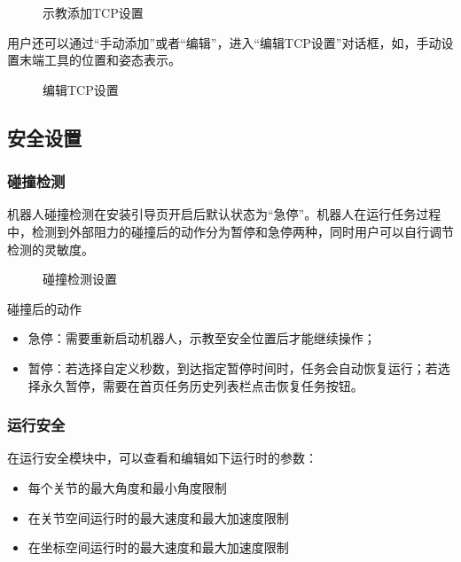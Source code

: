 \begin{figure}[ht]
	\centering
	\color{red}{缺图}
	\caption{示教添加TCP设置}
	\label{fig:示教添加TCP设置}
\end{figure}

用户还可以通过“手动添加”或者“编辑”，进入“编辑TCP设置”对话框，如，手动设置末端工具的位置和姿态表示。

\begin{figure}[ht]
	\centering
	\color{red}{缺图}
	\caption{编辑TCP设置}
	\label{fig:编辑TCP设置}
\end{figure}

\subsection{安全设置}
\subsubsection{碰撞检测}
机器人碰撞检测在安装引导页开启后默认状态为“急停”。机器人在运行任务过程中，检测到外部阻力的碰撞后的动作分为暂停和急停两种，同时用户可以自行调节检测的灵敏度。

\begin{figure}[ht]
	\centering
	\color{red}{缺图}
	\caption{碰撞检测设置}
	\label{fig:碰撞检测设置}
\end{figure}

碰撞后的动作
\begin{itemize}
	\item 急停：需要重新启动机器人，示教至安全位置后才能继续操作；
	\item 暂停：若选择自定义秒数，到达指定暂停时间时，任务会自动恢复运行；若选择永久暂停，需要在首页任务历史列表栏点击恢复任务按钮。
\end{itemize}

\subsubsection{运行安全}
\label{sec:运行安全}
在运行安全模块中，可以查看和编辑如下运行时的参数：
\begin{itemize}
	\item 每个关节的最大角度和最小角度限制
	\item 在关节空间运行时的最大速度和最大加速度限制
	\item 在坐标空间运行时的最大速度和最大加速度限制
\end{itemize}

